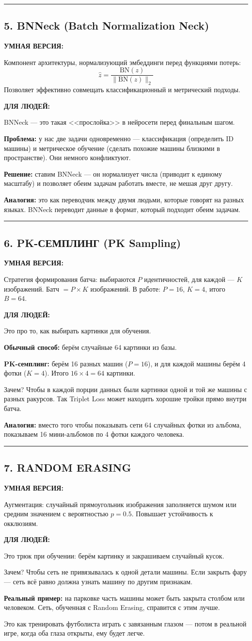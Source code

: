 \documentclass[12pt,a4paper]{article}
\newcommand{\term}[3]{
\noindent\rule{\textwidth}{1pt}
\subsection*{#1}

\textcolor{smartgreen}{\textbf{УМНАЯ ВЕРСИЯ:}}

#2

\vspace{0.5em}
\textcolor{simpleblue}{\textbf{ДЛЯ ЛЮДЕЙ:}}

#3

\vspace{1em}
}
\begin{document}
\term{5. BNNeck (Batch Normalization Neck)}
{Компонент архитектуры, нормализующий эмбеддинги перед функциями потерь:
\[
\hat{z} = \frac{\mathrm{BN}(z)}{\lVert \mathrm{BN}(z) \rVert_2}
\]
Позволяет эффективно совмещать классификационный и метрический подходы.}
{BNNeck — это такая <<прослойка>> в нейросети перед финальным шагом.

\textbf{Проблема:} у нас две задачи одновременно — классификация (определить ID машины) и метрическое обучение (сделать похожие машины близкими в пространстве). Они немного конфликтуют.

\textbf{Решение:} ставим BNNeck — он нормализует числа (приводит к единому масштабу) и позволяет обеим задачам работать вместе, не мешая друг другу.

\textbf{Аналогия:} это как переводчик между двумя людьми, которые говорят на разных языках. BNNeck переводит данные в формат, который подходит обеим задачам.}

\term{6. PK-СЕМПЛИНГ (PK Sampling)}
{Стратегия формирования батча: выбираются $P$ идентичностей, для каждой — $K$ изображений.
Батч $= P \times K$ изображений. В работе: $P=16$, $K=4$, итого $B=64$.}
{Это про то, как выбирать картинки для обучения.

\textbf{Обычный способ:} берём случайные 64 картинки из базы.

\textbf{PK-семплинг:} берём 16 разных машин ($P=16$), и для каждой машины берём 4 фотки ($K=4$). Итого $16 \times 4 = 64$ картинки.

Зачем? Чтобы в каждой порции данных были картинки одной и той же машины с разных ракурсов. Так Triplet Loss может находить хорошие тройки прямо внутри батча.

\textbf{Аналогия:} вместо того чтобы показывать сети 64 случайных фотки из альбома, показываем 16 мини-альбомов по 4 фотки каждого человека.}

\term{7. RANDOM ERASING}
{Аугментация: случайный прямоугольник изображения заполняется шумом или средним значением с вероятностью $p=0.5$. Повышает устойчивость к окклюзиям.}
{Это трюк при обучении: берём картинку и закрашиваем случайный кусок.

Зачем? Чтобы сеть не привязывалась к одной детали машины. Если закрыть фару — сеть всё равно должна узнать машину по другим признакам.

\textbf{Реальный пример:} на парковке часть машины может быть закрыта столбом или человеком. Сеть, обученная с Random Erasing, справится с этим лучше.

Это как тренировать футболиста играть с завязанным глазом — потом в реальной игре, когда оба глаза открыты, ему будет легче.}
\end{document}
